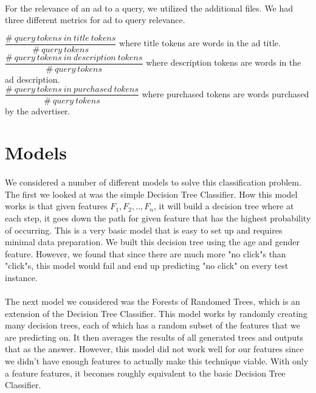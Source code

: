 \documentclass[11pt]{article}
\begin{document}
\paragraph{}
For the relevance of an ad to a query, we utilized the additional files. We had three different metrics for ad to query relevance.

$\dfrac{\#\ query\ tokens\ in\ title\ tokens}{\#\ query\ tokens}$ where title tokens 
are words in the ad title. \\

$\dfrac{\#\ query\ tokens\ in\ description\ tokens}{\#\ query\ tokens}$ where description tokens are words in the ad description. \\

$\dfrac{\#\ query\ tokens\ in\ purchased\ tokens}{\#\ query\ tokens}$ where purchased tokens are words purchased by the advertiser. \\

\section*{Models}
\paragraph{}
We considered a number of different models to solve this classification problem. The first we looked at was the simple Decision Tree Classifier. How this model works is that given features $F_1, F_2, .., F_n$, it will build a decision tree where at each step, it goes down the path for given feature that has the highest probability of occurring. This is a very basic model that is easy to set up and requires minimal data preparation. We built this decision tree using the age and gender feature. However, we found that since there are much more "no click"s than "click"s, this model would fail and end up predicting "no click" on every test instance.

\paragraph{}
The next model we considered was the Forests of Randomed Trees, which is an extension of the Decision Tree Classifier. This model works by randomly creating many decision trees, each of which has a random subset of the features that we are predicting on. It then averages the results of all generated trees and outputs that as the answer. However, this model did not work well for our features since we didn't have enough features to actually make this technique viable. With only a feature features, it becomes roughly equivalent to the basic Decision Tree Classifier.
\end{document}
